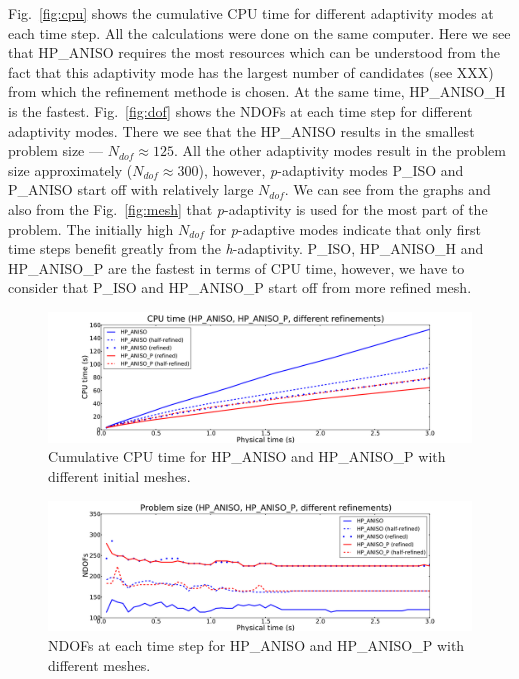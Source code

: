 Fig.~\ref{fig:cpu} shows the cumulative CPU time for different adaptivity
modes at each time step. All the calculations were done on the same computer.
Here we see that HP\_ANISO requires the most
resources which can be understood from the fact that this adaptivity mode has the largest number of 
candidates (see XXX) from which the refinement methode is chosen.
At the same time, HP\_ANISO\_H is the fastest.
Fig.~\ref{fig:dof} shows the NDOFs at each time step for different adaptivity modes.
There we see that the HP\_ANISO results in the smallest problem size --- $N_{dof} \approx 125$. 
All the other adaptivity modes result in  the problem size approximately ($N_{dof} \approx 300$), 
however, \emph{p}-adaptivity modes P\_ISO and P\_ANISO start off with relatively large $N_{dof}$.
We can see from the graphs and also from the Fig.~\ref{fig:mesh} that
\emph{p}-adaptivity is used for the most part of the problem. The initially high
$N_{dof}$ for \emph{p}-adaptive modes indicate that only first time steps benefit
greatly from the \emph{h}-adaptivity. P\_ISO, HP\_ANISO\_H
and HP\_ANISO\_P are the fastest in terms of CPU time, however, we have to consider
that P\_ISO  and HP\_ANISO\_P start off from more refined mesh.

\begin{figure}
  \begin{centering}
  \includegraphics[width=\columnwidth]{refined_cpu}
  \caption{\label{fig:refined-cpu} Cumulative CPU time for HP\_ANISO and HP\_ANISO\_P
  with different initial meshes.}
  \end{centering}
\end{figure}

\begin{figure}
  \begin{centering}
  \includegraphics[width=\columnwidth]{refined_dof}
  \caption{\label{fig:refined-dof} NDOFs at each time step for
  HP\_ANISO and HP\_ANISO\_P with different meshes.}
  \end{centering}
\end{figure}

